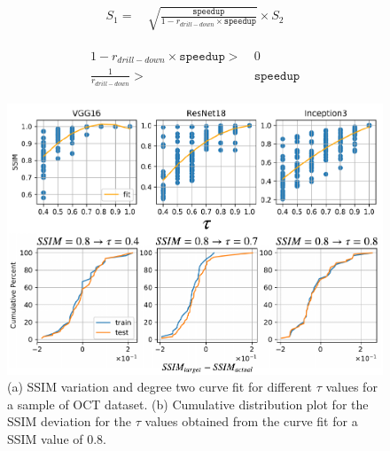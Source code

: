 \begin{align}
\label{eqn:s1}
S_1 = &~ \sqrt{\frac{\texttt{speedup}}{1 - r_{drill-down} \times \texttt{speedup}}} \times S_2
\end{align}

\begin{align}
\label{eqn:speedup_bound}
\begin{split}
1 - r_{drill-down} \times \texttt{speedup} > &~ 0 \\
\frac{1}{r_{drill-down}} > &~ \texttt{speedup}
\end{split}
\end{align}


\begin{figure}[t]
\includegraphics[width=\columnwidth]{images/system_tuning}
\caption{(a) SSIM variation and degree two curve fit for different $\tau$ values for a sample of OCT dataset. (b) Cumulative distribution plot for the SSIM deviation for the $\tau$ values obtained from the curve fit for a SSIM value of 0.8.}
\label{fig:system_tuning}
\end{figure}
